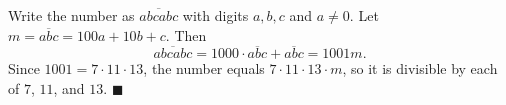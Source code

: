Write the number as $\overline{abcabc}$ with digits $a,b,c$ and $a\ne0$. Let $m=\overline{abc}=100a+10b+c$. Then
\[
\overline{abcabc}=1000\cdot\overline{abc}+\overline{abc}=1001m.
\]
Since $1001=7\cdot11\cdot13$, the number equals $7\cdot11\cdot13\cdot m$, so it is divisible by each of $7$, $11$, and $13$. $\blacksquare$

